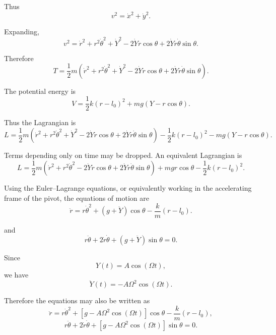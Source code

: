 \documentclass[11pt, a4paper]{article} %
\begin{document}
Thus
\[
v^2=\dot x^2+\dot y^2.
\]

Expanding,
\[
v^2
=
\dot r^2+r^2\dot\theta^2+\dot Y^2
-2\dot Y\dot r\cos\theta
+
2\dot Y r\dot\theta\sin\theta.
\]

Therefore
\[
T
=
\frac12 m
\left(
\dot r^2+r^2\dot\theta^2+\dot Y^2
-2\dot Y\dot r\cos\theta
+
2\dot Y r\dot\theta\sin\theta
\right).
\]

The potential energy is
\[
V
=
\frac12 k(r-l_0)^2
+
mg\left(Y-r\cos\theta\right).
\]

Thus the Lagrangian is
\[
\boxed{
L
=
\frac12 m
\left(
\dot r^2+r^2\dot\theta^2+\dot Y^2
-2\dot Y\dot r\cos\theta
+
2\dot Y r\dot\theta\sin\theta
\right)
-
\frac12 k(r-l_0)^2
-
mg\left(Y-r\cos\theta\right).
}
\]

Terms depending only on time may be dropped. An equivalent Lagrangian is
\[
\boxed{
L
=
\frac12 m
\left(
\dot r^2+r^2\dot\theta^2
-2\dot Y\dot r\cos\theta
+
2\dot Y r\dot\theta\sin\theta
\right)
+
mgr\cos\theta
-
\frac12 k(r-l_0)^2.
}
\]

Using the Euler--Lagrange equations, or equivalently working in the accelerating frame of the pivot, the equations of motion are
\[
\boxed{
\ddot r
=
r\dot\theta^2
+
\left(g+\ddot Y\right)\cos\theta
-
\frac{k}{m}(r-l_0).
}
\]

and
\[
\boxed{
r\ddot\theta
+
2\dot r\dot\theta
+
\left(g+\ddot Y\right)\sin\theta
=0.
}
\]

Since
\[
Y(t)=A\cos(\Omega t),
\]
we have
\[
\ddot Y(t)=-A\Omega^2\cos(\Omega t).
\]

Therefore the equations may also be written as
\[
\boxed{
\ddot r
=
r\dot\theta^2
+
\left[g-A\Omega^2\cos(\Omega t)\right]\cos\theta
-
\frac{k}{m}(r-l_0),
}
\]
\[
\boxed{
r\ddot\theta
+
2\dot r\dot\theta
+
\left[g-A\Omega^2\cos(\Omega t)\right]\sin\theta
=0.
}
\]


\newpage
\end{document}
